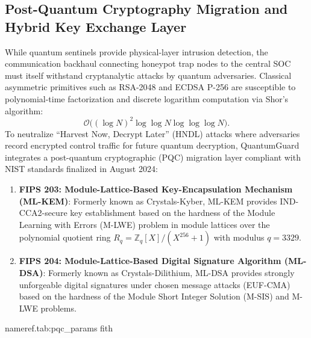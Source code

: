 \documentclass[journal,10pt]{IEEEtran}
\makeatletter
\let\orig@label\label
\def\label#1{%
  \orig@label{#1}%
  \pdfdest name{ref.#1} fith\relax
}
\makeatother
\begin{document}
\subsection{Post-Quantum Cryptography Migration and Hybrid Key Exchange Layer}
While quantum sentinels provide physical-layer intrusion detection, the communication backhaul connecting honeypot trap nodes to the central SOC must itself withstand cryptanalytic attacks by quantum adversaries. Classical asymmetric primitives such as RSA-2048 and ECDSA P-256 are susceptible to polynomial-time factorization and discrete logarithm computation via Shor's algorithm:
\begin{equation}
  \mathcal{O}\bigl((\log N)^2 \log\log N \log\log\log N\bigr).
\end{equation}
To neutralize ``Harvest Now, Decrypt Later'' (HNDL) attacks where adversaries record encrypted control traffic for future quantum decryption, QuantumGuard integrates a post-quantum cryptographic (PQC) migration layer compliant with NIST standards finalized in August 2024:
\begin{enumerate}
    \item \textbf{FIPS 203: Module-Lattice-Based Key-Encapsulation Mechanism (ML-KEM)}: Formerly known as Crystals-Kyber, ML-KEM provides IND-CCA2-secure key establishment based on the hardness of the Module Learning with Errors (M-LWE) problem in module lattices over the polynomial quotient ring $R_q = \mathbb{Z}_q[X]/(X^{256} + 1)$ with modulus $q = 3329$.
    \item \textbf{FIPS 204: Module-Lattice-Based Digital Signature Algorithm (ML-DSA)}: Formerly known as Crystals-Dilithium, ML-DSA provides strongly unforgeable digital signatures under chosen message attacks (EUF-CMA) based on the hardness of the Module Short Integer Solution (M-SIS) and M-LWE problems.
\end{enumerate}

\begin{table}[h]
\centering
\caption{NIST Post-Quantum Cryptographic Parameter Specifications (FIPS 203 \& FIPS 204)}
\label{tab:pqc_params}
\end{table}
\end{document}
